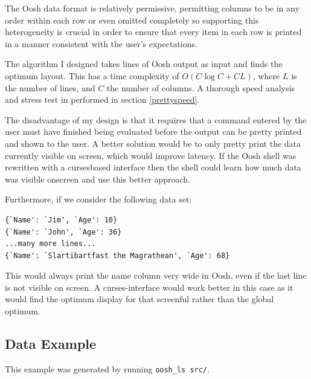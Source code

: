 \documentclass[12pt,twoside,notitlepage]{report}
\begin{document}
The Oosh data format is relatively permissive, permitting columns to
be in any order within each row or even omitted completely so
supporting this heterogeneity is crucial in order to ensure that every
item in each row is printed in a manner consistent with the user's
expectations.

The algorithm I designed takes lines of Oosh output as input and finds
the optimum layout. This has a time complexity of $O(C \log C + CL)$,
where $L$ is the number of lines, and $C$ the number of columns. A
thorough speed analysis and stress test in performed in section
\ref{prettyspeed}.

The disadvantage of my design is that it requires that a command
entered by the user must have finished being evaluated before the
output can be pretty printed and shown to the user. A better solution
would be to only pretty print the data currently visible on screen,
which would improve latency. If the Oosh shell was rewritten with a
curses\footnotemark[2] based interface then the shell could learn how
much data was visible onscreen and use this better approach.

Furthermore, if we consider the following data set:


\begin{verbatim}
{`Name': `Jim', `Age': 10}
{`Name': `John', `Age': 36}
...many more lines...
{`Name': `Slartibartfast the Magrathean', `Age': 68}
\end{verbatim}

This would always print the name column very wide in Oosh, even if the last
line is not visible on screen. A curses-interface would work better in
this case as it would find the optimum display for that screenful
rather than the global optimum.



\subsection{Data Example}

This example was generated by running {\tt oosh\_ls src/}.
\end{document}
